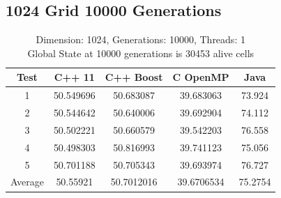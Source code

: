 \documentclass[11pt]{article} %
\begin{document}
\subsection{1024 Grid 10000 Generations}
\begin{table}[ht]
\caption{Dimension: 1024, Generations: 10000, Threads: 1\\Global State at 10000 generations is 30453 alive cells} %

\centering %

\begin{tabular}{c c c c c} %

\hline\hline %

Test & C++ 11 & C++ Boost & C OpenMP & Java \\ [0.5ex] %


\hline %

1 & 50.549696 & 50.683087 & 39.683063 & 73.924 \\ 
2 & 50.544642 & 50.640006 & 39.692904 & 74.112 \\
3 & 50.502221 & 50.660579 & 39.542203 & 76.558 \\
4 & 50.498303 & 50.816993 & 39.741123 & 75.056 \\
5 & 50.701188 & 50.705343 & 39.693974 & 76.727 \\
Average & 50.55921 & 50.7012016 & 39.6706534 & 75.2754 \\ [1ex]



\hline %
\end{tabular}
\end{table}
\end{document}
